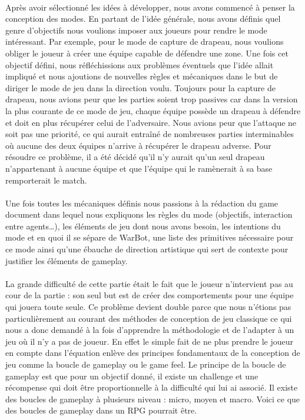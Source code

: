 \documentclass{report}
\begin{document}
 \paragraph{}
  Après avoir sélectionné les idées à développer, nous avons commencé à penser la conception des modes. En partant de l’idée générale, nous avons définis quel genre d’objectifs nous voulions imposer aux joueurs pour rendre le mode intéressant. Par exemple, pour le mode de capture de drapeau, nous voulions obliger le joueur à créer une équipe capable de défendre une zone. \newline
Une fois cet objectif défini, nous réfléchissions aux problèmes éventuels que l’idée allait impliqué et nous ajoutions de nouvelles règles et mécaniques dans le but de diriger le mode de jeu dans la direction voulu. Toujours pour la capture de drapeau, nous avions peur que les parties soient trop passives car dans la version la plus courante de ce mode de jeu, chaque équipe possède un drapeau à défendre et doit en plus récupérer celui de l’adversaire. Nous avions peur que l’attaque ne soit pas une priorité, ce qui aurait entraîné de nombreuses parties interminables où aucune des deux équipes n’arrive à récupérer le drapeau adverse. Pour résoudre ce problème, il a été décidé qu’il n’y aurait qu’un seul drapeau n’appartenant à aucune équipe et que l’équipe qui le ramènerait à sa base remporterait le match.
\paragraph{}

  Une fois toutes les mécaniques définis nous passions à la rédaction du game document dans lequel nous expliquons les règles du mode (objectifs, interaction entre agents…), les éléments de jeu dont nous avons besoin, les intentions du mode et en quoi il se sépare de WarBot, une liste des primitives nécessaire pour ce mode ainsi qu’une ébauche de direction artistique qui sert de contexte pour justifier les éléments de gameplay.
\paragraph{}

  La grande difficulté de cette partie était le fait que le joueur n’intervient pas au cour de la partie : son seul but est de créer des comportements pour une équipe qui jouera toute seule. Ce problème devient double parce que nous n’étions pas particulièrement au courant des méthodes de conception de jeu classique ce qui nous a donc demandé à la fois d’apprendre la méthodologie et de l’adapter à un jeu où il n’y a pas de joueur. \newline
En effet le simple fait de ne plus prendre le joueur en compte dans l’équation enlève des principes fondamentaux de la conception de jeu comme la boucle de gameplay ou le game feel. 
Le principe de la boucle de gameplay est que  pour un objectif donné, il existe un challenge et une récompense qui doit être proportionnelle à la difficulté qui lui ai associé. Il existe des boucles de gameplay à plusieurs niveau : micro, moyen et macro. Voici ce que des boucles de gameplay dans un RPG pourrait être.
\end{document}
